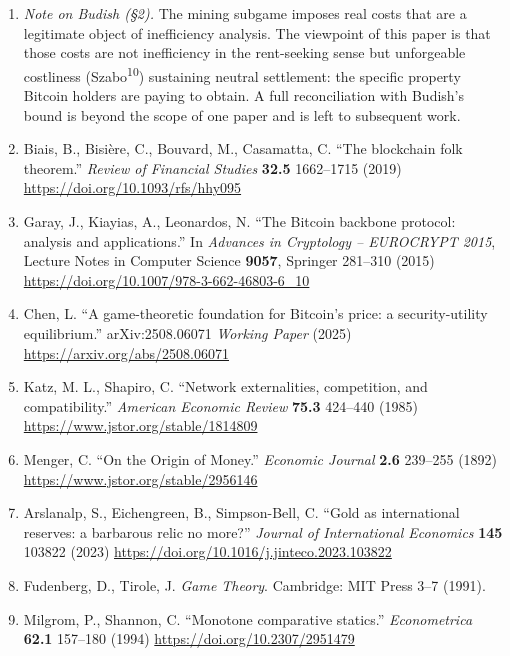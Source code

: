 \documentclass[12pt]{article}
\theoremstyle{definition}
\theoremstyle{remark}
\begin{document}
\begin{enumerate}[leftmargin=*,labelsep=0.5em,label=\arabic*.]
\item \emph{Note on Budish (\S2).} The mining subgame imposes real costs that are a legitimate object of inefficiency analysis. The viewpoint of this paper is that those costs are not inefficiency in the rent-seeking sense but unforgeable costliness (Szabo\textsuperscript{10}) sustaining neutral settlement: the specific property Bitcoin holders are paying to obtain. A full reconciliation with Budish's bound is beyond the scope of one paper and is left to subsequent work.

\item Biais, B., Bisi\`ere, C., Bouvard, M., Casamatta, C. ``The
blockchain folk theorem.'' \emph{Review of Financial Studies}
\textbf{32.5} 1662--1715 (2019)
\url{https://doi.org/10.1093/rfs/hhy095}

\item Garay, J., Kiayias, A., Leonardos, N. ``The Bitcoin
backbone protocol: analysis and applications.'' In
\emph{Advances in Cryptology -- EUROCRYPT 2015},
Lecture Notes in Computer Science \textbf{9057},
Springer 281--310 (2015)
\url{https://doi.org/10.1007/978-3-662-46803-6_10}

\item Chen, L. ``A game-theoretic foundation for Bitcoin's
price: a security-utility equilibrium.'' arXiv:2508.06071
\emph{Working Paper} (2025) \url{https://arxiv.org/abs/2508.06071}

\item Katz, M. L., Shapiro, C. ``Network externalities,
competition, and compatibility.'' \emph{American Economic
Review} \textbf{75.3} 424--440 (1985)
\url{https://www.jstor.org/stable/1814809}

\item Menger, C. ``On the Origin of Money.'' \emph{Economic Journal}
\textbf{2.6} 239--255 (1892)
\url{https://www.jstor.org/stable/2956146}

\item Arslanalp, S., Eichengreen, B., Simpson-Bell, C. ``Gold as
international reserves: a barbarous relic no more?'' \emph{Journal of
International Economics} \textbf{145} 103822 (2023)
\url{https://doi.org/10.1016/j.jinteco.2023.103822}

\item Fudenberg, D., Tirole, J. \emph{Game Theory}. Cambridge:
MIT Press 3--7 (1991).

\item Milgrom, P., Shannon, C. ``Monotone comparative statics.''
\emph{Econometrica} \textbf{62.1} 157--180 (1994)
\url{https://doi.org/10.2307/2951479}


\end{enumerate}
\end{document}
